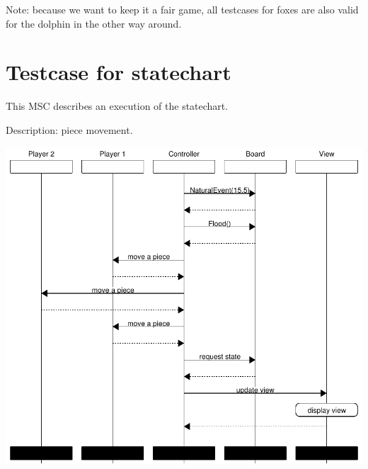 \documentclass[a4paper,11pt]{article}
\begin{document}
    Note: because we want to keep it a fair game, all testcases for foxes are also valid for the dolphin in the other way around.\\

	\section{Testcase for statechart}
	This MSC describes an execution of the statechart.

	Description: piece movement.

	\includegraphics[width=\linewidth]{test_statechart}
\end{document}
